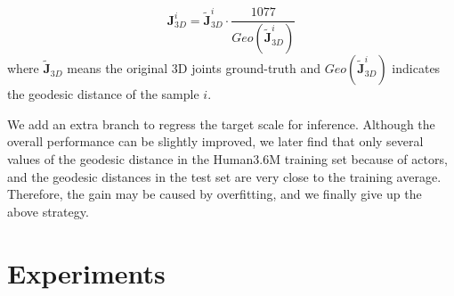 \documentclass[letterpaper]{article} \usepackage{aaai21}  \usepackage{times}  \usepackage{helvet} \usepackage{courier}  \usepackage[hyphens]{url}  \usepackage{graphicx} \urlstyle{rm} \def\UrlFont{\rm}  \usepackage{natbib}  \usepackage{caption} \frenchspacing  \setlength{\pdfpagewidth}{8.5in}  \setlength{\pdfpageheight}{11in}
\begin{document}
\begin{equation}
{\mathbf{J}}_{3D}^i={\tilde{\mathbf{J}}_{3D}^i}\cdot\frac{1077}{Geo(\tilde{\mathbf{J}}_{3D}^i)}
\end{equation}
where $ \tilde{\mathbf{J}}_{3D}$ means the original 3D joints ground-truth and $Geo(\tilde{\mathbf{J}}_{3D}^i)$ indicates the geodesic distance of the sample $i$.

We add an extra branch to regress the target scale for inference. Although the overall performance can be slightly improved, we later find that only several values of the geodesic distance in the Human3.6M training set because of actors, and the geodesic distances in the test set are very close to the training average. Therefore, the gain may be caused by overfitting, and we finally give up the above strategy.


\section{Experiments}
\end{document}
